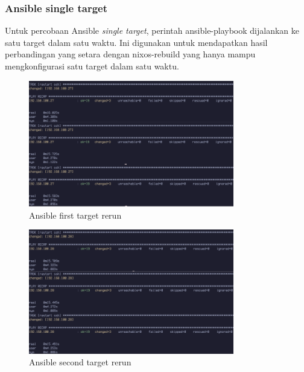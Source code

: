 \documentclass[10pt,]{report}
\begin{document}
\begin{adjustwidth}{20pt}{}
	\subsubsection{Ansible single target}
	\begin{adjustwidth}{20pt}{}
		Untuk percobaan Ansible \textit{single target}, perintah ansible-playbook dijalankan
		ke satu target dalam satu waktu. Ini digunakan untuk mendapatkan hasil perbandingan
		yang setara dengan nixos-rebuild yang hanya mampu mengkonfigurasi satu target
		dalam satu waktu.
	\end{adjustwidth}
	\begin{figure}[H]
		\begin{center}
			\includegraphics[width=0.8\textwidth]{images/ansible/single/ansible-rerun-27-com.png}
		\end{center}
		\caption{Ansible first target rerun}
	\end{figure}
	\begin{figure}[H]
		\begin{center}
			\includegraphics[width=0.8\textwidth]{images/ansible/single/ansible-rerun-28-com.png}
		\end{center}
		\caption{Ansible second target rerun}
	\end{figure}


\end{adjustwidth}
\end{document}
